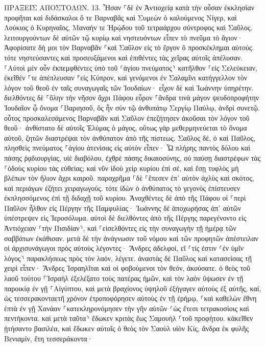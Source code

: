 \documentclass[twoside, 9pt]{extreport}
\begin{document}
ΠΡΑΞΕΙΣ ΑΠΟΣΤΟΛΩΝ.
13.
Ἦσαν ⸀δὲ ἐν Ἀντιοχείᾳ κατὰ τὴν οὖσαν ἐκκλησίαν προφῆται καὶ διδάσκαλοι ὅ τε Βαρναβᾶς καὶ Συμεὼν ὁ καλούμενος Νίγερ, καὶ Λούκιος ὁ Κυρηναῖος, Μαναήν τε Ἡρῴδου τοῦ τετραάρχου σύντροφος καὶ Σαῦλος. 
λειτουργούντων δὲ αὐτῶν τῷ κυρίῳ καὶ νηστευόντων εἶπεν τὸ πνεῦμα τὸ ἅγιον· Ἀφορίσατε δή μοι τὸν Βαρναβᾶν ⸀καὶ Σαῦλον εἰς τὸ ἔργον ὃ προσκέκλημαι αὐτούς. 
τότε νηστεύσαντες καὶ προσευξάμενοι καὶ ἐπιθέντες τὰς χεῖρας αὐτοῖς ἀπέλυσαν. 
⸀Αὐτοὶ μὲν οὖν ἐκπεμφθέντες ὑπὸ τοῦ ⸂ἁγίου πνεύματος⸃ κατῆλθον ⸀εἰς Σελεύκειαν, ἐκεῖθέν ⸀τε ἀπέπλευσαν ⸁εἰς Κύπρον, 
καὶ γενόμενοι ἐν Σαλαμῖνι κατήγγελλον τὸν λόγον τοῦ θεοῦ ἐν ταῖς συναγωγαῖς τῶν Ἰουδαίων· εἶχον δὲ καὶ Ἰωάννην ὑπηρέτην. 
διελθόντες δὲ ⸀ὅλην τὴν νῆσον ἄχρι Πάφου εὗρον ⸀ἄνδρα τινὰ μάγον ψευδοπροφήτην Ἰουδαῖον ᾧ ὄνομα ⸀Βαριησοῦ, 
ὃς ἦν σὺν τῷ ἀνθυπάτῳ Σεργίῳ Παύλῳ, ἀνδρὶ συνετῷ. οὗτος προσκαλεσάμενος Βαρναβᾶν καὶ Σαῦλον ἐπεζήτησεν ἀκοῦσαι τὸν λόγον τοῦ θεοῦ· 
ἀνθίστατο δὲ αὐτοῖς Ἐλύμας ὁ μάγος, οὕτως γὰρ μεθερμηνεύεται τὸ ὄνομα αὐτοῦ, ζητῶν διαστρέψαι τὸν ἀνθύπατον ἀπὸ τῆς πίστεως. 
Σαῦλος δέ, ὁ καὶ Παῦλος, πλησθεὶς πνεύματος ⸀ἁγίου ἀτενίσας εἰς αὐτὸν 
εἶπεν· Ὦ πλήρης παντὸς δόλου καὶ πάσης ῥᾳδιουργίας, υἱὲ διαβόλου, ἐχθρὲ πάσης δικαιοσύνης, οὐ παύσῃ διαστρέφων τὰς ⸀ὁδοὺς κυρίου τὰς εὐθείας; 
καὶ νῦν ἰδοὺ χεὶρ κυρίου ἐπὶ σέ, καὶ ἔσῃ τυφλὸς μὴ βλέπων τὸν ἥλιον ἄχρι καιροῦ. παραχρῆμα ⸀δὲ ⸀ἔπεσεν ἐπ᾽ αὐτὸν ἀχλὺς καὶ σκότος, καὶ περιάγων ἐζήτει χειραγωγούς. 
τότε ἰδὼν ὁ ἀνθύπατος τὸ γεγονὸς ἐπίστευσεν ἐκπλησσόμενος ἐπὶ τῇ διδαχῇ τοῦ κυρίου. 
Ἀναχθέντες δὲ ἀπὸ τῆς Πάφου οἱ ⸀περὶ Παῦλον ἦλθον εἰς Πέργην τῆς Παμφυλίας· Ἰωάννης δὲ ἀποχωρήσας ἀπ᾽ αὐτῶν ὑπέστρεψεν εἰς Ἱεροσόλυμα. 
αὐτοὶ δὲ διελθόντες ἀπὸ τῆς Πέργης παρεγένοντο εἰς Ἀντιόχειαν ⸂τὴν Πισιδίαν⸃, καὶ ⸀εἰσελθόντες εἰς τὴν συναγωγὴν τῇ ἡμέρᾳ τῶν σαββάτων ἐκάθισαν. 
μετὰ δὲ τὴν ἀνάγνωσιν τοῦ νόμου καὶ τῶν προφητῶν ἀπέστειλαν οἱ ἀρχισυνάγωγοι πρὸς αὐτοὺς λέγοντες· Ἄνδρες ἀδελφοί, εἴ ⸀τίς ἐστιν ⸂ἐν ὑμῖν λόγος⸃ παρακλήσεως πρὸς τὸν λαόν, λέγετε. 
ἀναστὰς δὲ Παῦλος καὶ κατασείσας τῇ χειρὶ εἶπεν· Ἄνδρες Ἰσραηλῖται καὶ οἱ φοβούμενοι τὸν θεόν, ἀκούσατε. 
ὁ θεὸς τοῦ λαοῦ τούτου ⸀Ἰσραὴλ ἐξελέξατο τοὺς πατέρας ἡμῶν, καὶ τὸν λαὸν ὕψωσεν ἐν τῇ παροικίᾳ ἐν γῇ ⸀Αἰγύπτου, καὶ μετὰ βραχίονος ὑψηλοῦ ἐξήγαγεν αὐτοὺς ἐξ αὐτῆς, 
καί, ὡς τεσσερακονταετῆ χρόνον ἐτροποφόρησεν αὐτοὺς ἐν τῇ ἐρήμῳ, 
⸀καὶ καθελὼν ἔθνη ἑπτὰ ἐν γῇ Χανάαν ⸀κατεκληρονόμησεν τὴν γῆν αὐτῶν 
⸂ὡς ἔτεσι τετρακοσίοις καὶ πεντήκοντα. καὶ μετὰ ταῦτα⸃ ἔδωκεν κριτὰς ἕως Σαμουὴλ ⸀τοῦ προφήτου. 
κἀκεῖθεν ᾐτήσαντο βασιλέα, καὶ ἔδωκεν αὐτοῖς ὁ θεὸς τὸν Σαοὺλ υἱὸν Κίς, ἄνδρα ἐκ φυλῆς Βενιαμίν, ἔτη τεσσεράκοντα· 
\end{document}
